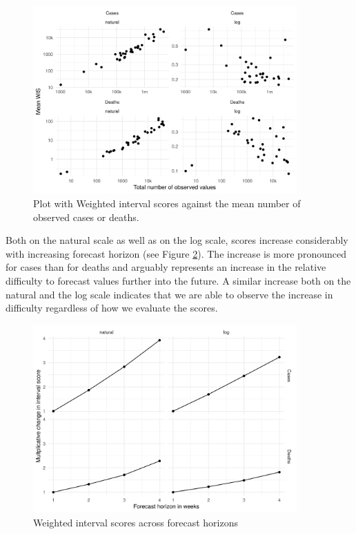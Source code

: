 \documentclass{article}
\begin{document}
\begin{figure}[h!]
    \centering
    \includegraphics[width=0.9\textwidth]{output/figures/HUB-mean-scores-vs-total-log-log.png}
    \caption{Plot with Weighted interval scores against the mean number of observed cases or deaths.}
    \label{fig:HUB-mean-scores-total-loglog}
\end{figure}

Both on the natural scale as well as on the log scale, scores increase considerably with increasing forecast horizon (see Figure \ref{fig:HUB-scores-horizon}). The increase is more pronounced for cases than for deaths and arguably represents an increase in the relative difficulty to forecast values further into the future. A similar increase both on the natural and the log scale indicates that we are able to observe the increase in difficulty regardless of how we evaluate the scores. 

\begin{figure}[h!]
    \centering
    \includegraphics[width=0.9\textwidth]{output/figures/HUB-scores-over-horizon.png}
    \caption{Weighted interval scores across forecast horizons}
    \label{fig:HUB-scores-horizon}
\end{figure}
\end{document}
